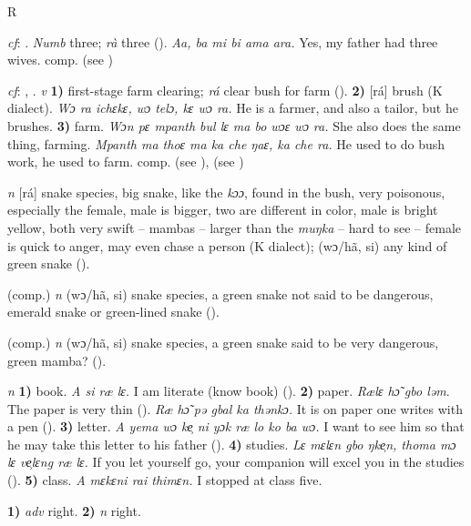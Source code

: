 \begin{letter}{R}

 \textit{cf}: . \textit{Numb} three; \textit{rà} three (\citealt{Sumner1921}). \textit{Aa, ba mi bi ama ara.} Yes, my father had three wives. comp.  (see ) 

 \textit{cf}: , . \textit{v} \textbf{1)} first-stage farm clearing; \textit{rá} clear bush for farm (\citealt{Sumner1921}). \textbf{2)} [rá] brush (K dialect). \textit{Wɔ ra ichɛkɛ, wɔ telɔ, kɛ wɔ ra.} He is a farmer, and also a tailor, but he brushes. \textbf{3)} farm. \textit{Wɔn pɛ mpanth bul lɛ ma bo wɔɛ wɔ ra.} She also does the same thing, farming. \textit{Mpanth ma thoɛ ma ka che ŋaɛ, ka che ra.} He used to do bush work, he used to farm. comp.  (see ),  (see ) 

 \textit{n} [rá] snake species, big snake, like the \textit{kɔɔ}, found in the bush, very poisonous, especially the female, male is bigger, two are different in color, male is bright yellow, both very swift – mambas – larger than the \textit{muŋka} – hard to see – female is quick to anger, may even chase a person (K dialect); (wɔ/hã, si) any kind of green snake (\citealt{Pichl1967}).

 (comp.) \textit{n} (wɔ/hã, si) snake species, a green snake not said to be dangerous, emerald snake or green-lined snake (\citealt{Pichl1967}). 

 (comp.) \textit{n} (wɔ/hã, si) snake species, a green snake said to be very dangerous, green mamba? (\citealt{Pichl1967}). 

 \textit{n} \textbf{1)} book. \textit{A si ræ lɛ.} I am literate (know book) (\citealt{Pichl1967}). \textbf{2)} paper. \textit{Rælɛ hɔ̃ gbo ləm}. The paper is very thin (\citealt{Pichl1967}). \textit{Ræ hɔ̃ pə gbal ka thənkɔ.} It is on paper one writes with a pen (\citealt{Pichl1967}). \textbf{3)} letter. \textit{A yema wɔ ke̹ ni yɔk ræ lo ko ba wɔ.} I want to see him so that he may take this letter to his father (\citealt{Pichl1967}). \textbf{4)} studies. \textit{Lɛ mɛlɛn gbo ŋke̹n, thoma mɔ lɛ ve̹lɛng ræ lɛ.} If you let yourself go, your companion will excel you in the studies (\citealt{Pichl1967}). \textbf{5)} class. \textit{A mɛkɛni rai thimɛn.} I stopped at class five.

 \textbf{1)} \textit{adv} right. \textbf{2)} \textit{n} right.


\end{letter}
